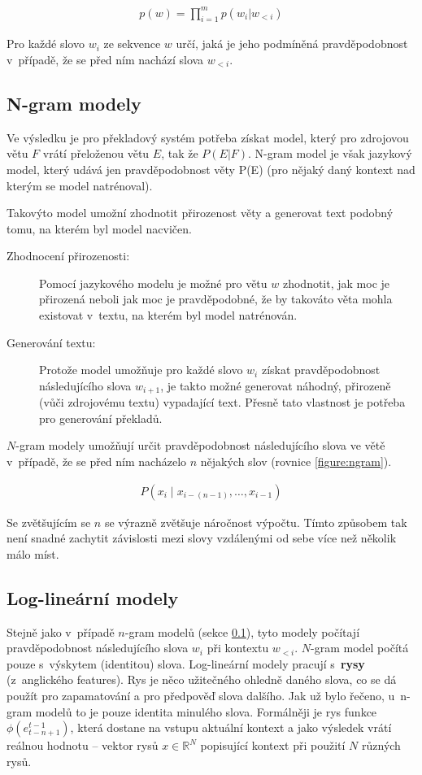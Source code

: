 \begin{align}\label{figure:probdistr}
  p(w) = \prod_{i=1}^{m} p(w_i|w_{<i})
\end{align}

Pro každé slovo $w_i$ ze sekvence $w$ určí, jaká je jeho podmíněná pravděpodobnost v~případě, že se před ním nachází slova $w_{<i}$.

\subsection{N-gram modely}\label{subsection:ngram}
Ve výsledku je pro překladový systém potřeba získat model, který pro zdrojovou větu $F$ vrátí přeloženou větu $E$, tak že $P(E|F)$. N-gram model je však jazykový model, který udává jen pravděpodobnost věty P(E) (pro nějaký daný kontext nad kterým se model natrénoval).

Takovýto model umožní zhodnotit přirozenost věty a generovat text podobný tomu, na kterém byl model nacvičen.

\begin{description}
  \item[Zhodnocení přirozenosti:] Pomocí jazykového modelu je možné pro větu $w$ zhodnotit, jak moc je přirozená neboli jak moc je pravděpodobné, že by takováto věta mohla existovat v~textu, na kterém byl model natrénován.
  \item[Generování textu:] Protože model umožňuje pro každé slovo $w_i$ získat pravděpodobnost následujícího slova $w_{i+1}$, je takto možné generovat náhodný, přirozeně (vůči zdrojovému textu) vypadající text. Přesně tato vlastnost je potřeba pro generování překladů.
\end{description}

$N$-gram modely umožňují určit pravděpodobnost následujícího slova ve větě v~případě, že se před ním nacházelo $n$ nějakých slov (rovnice \ref{figure:ngram}).

\begin{align}\label{figure:ngram}
    P(x_{i}\mid x_{{i-(n-1)}},\dots ,x_{{i-1}})
\end{align}

Se zvětšujícím se $n$ se výrazně zvětšuje náročnost výpočtu. Tímto způsobem tak není snadné zachytit závislosti mezi slovy vzdálenými od sebe více než několik málo míst.

\subsection{Log-lineární modely} \label{subsection:loglinear}
Stejně jako v~případě $n$-gram modelů (sekce \ref{subsection:ngram}), tyto modely počítají pravděpodobnost následujícího slova $w_i$ při kontextu $w_{<i}$. $N$-gram model počítá pouze s~výskytem (identitou) slova. Log-lineární modely pracují s~\textbf{rysy} (z~anglického features). Rys je něco užitečného ohledně daného slova, co se dá použít pro zapamatování a pro předpověď slova dalšího. Jak už bylo řečeno, u~n-gram modelů to je pouze identita minulého slova. Formálněji je rys funkce $\phi(e^{t-1}_{t-n+1})$, která dostane na vstupu aktuální kontext a jako výsledek vrátí reálnou hodnotu -- vektor rysů $x \in \mathbb{R}^N$ popisující kontext při použití $N$ různých rysů.

